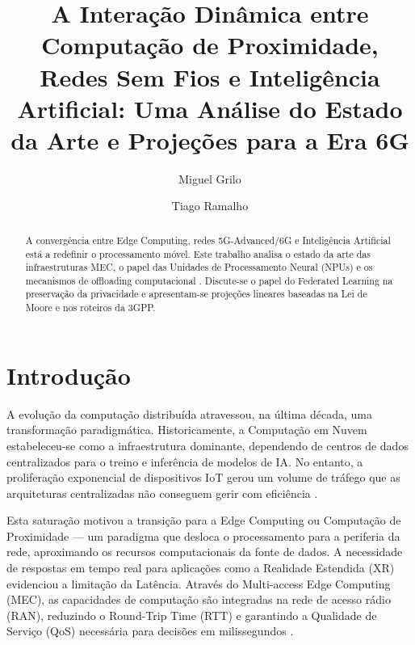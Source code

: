 \documentclass[runningheads]{llncs}
\begin{document}
\title{A Interação Dinâmica entre Computação de Proximidade, Redes Sem Fios e Inteligência Artificial: Uma Análise do Estado da Arte e Projeções para a Era 6G}


\author{Miguel Grilo \and Tiago Ramalho}

\maketitle

\begin{abstract}
A convergência entre Edge Computing, redes 5G-Advanced/6G e Inteligência Artificial está a redefinir o processamento móvel. Este trabalho analisa o estado da arte das infraestruturas MEC, o papel das Unidades de Processamento Neural (NPUs) e os mecanismos de offloading computacional \cite{pmc2022}. Discute-se o papel do Federated Learning na preservação da privacidade e apresentam-se projeções lineares baseadas na Lei de Moore e nos roteiros da 3GPP.

\end{abstract}

\section{Introdução}
A evolução da computação distribuída atravessou, na última década, uma transformação paradigmática. Historicamente, a Computação em Nuvem estabeleceu-se como a infraestrutura dominante, dependendo de centros de dados centralizados para o treino e inferência de modelos de IA.
No entanto, a proliferação exponencial de dispositivos IoT gerou um volume de tráfego que as arquiteturas centralizadas não conseguem gerir com eficiência \cite{Wang2020}.

Esta saturação motivou a transição para a Edge Computing ou Computação de Proximidade --- um paradigma que desloca o processamento para a periferia da rede, aproximando os recursos computacionais da fonte de dados.
A necessidade de respostas em tempo real para aplicações como a Realidade Estendida (XR) evidenciou a limitação da Latência. Através do Multi-access Edge Computing (MEC), as capacidades de computação são integradas na rede de acesso rádio (RAN), reduzindo o Round-Trip Time (RTT) e garantindo a Qualidade de Serviço (QoS) necessária para decisões em milissegundos \cite{cui2025}.
\end{document}
